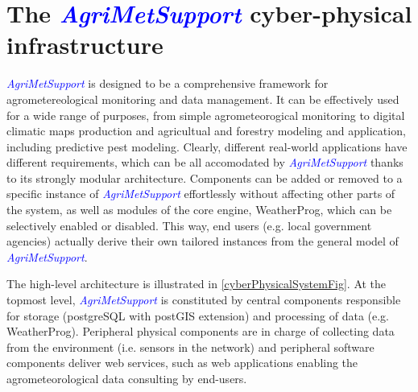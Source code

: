 \documentclass[authoryear,preprint,review,12pt]{elsarticle}
\newcommand{\update}[1]{\emph{\textcolor{blue}{#1}}}
\newcommand{\gci}{\update{AgriMetSupport}\xspace}
\begin{document}
\section{The \gci cyber-physical infrastructure} \label{sec:gci}

\gci is designed to be a comprehensive framework for agrometereological monitoring and data management.
It can be effectively used for a wide range of purposes, from simple agrometeorogical monitoring to digital climatic maps production and agricultual and forestry modeling and application, including predictive pest modeling.
Clearly, different real-world applications have different requirements, which can be all accomodated by \gci thanks to its strongly modular architecture.
Components can be added or removed to a specific instance of \gci effortlessly without affecting other parts of the system, as well as modules of the core engine, WeatherProg, which can be selectively enabled or disabled.
This way, end users (e.g. local government agencies) actually derive their own tailored instances from the general model of \gci.

The high-level architecture is illustrated in \cref{cyberPhysicalSystemFig}.
At the topmost level, \gci is constituted by central components responsible for storage (postgreSQL with postGIS extension) and processing of data (e.g. WeatherProg).
Peripheral physical components are in charge of collecting data from the environment (i.e. sensors in the network) and peripheral software components deliver web services, such as web applications enabling the agrometeorological data consulting by end-users.
\end{document}
